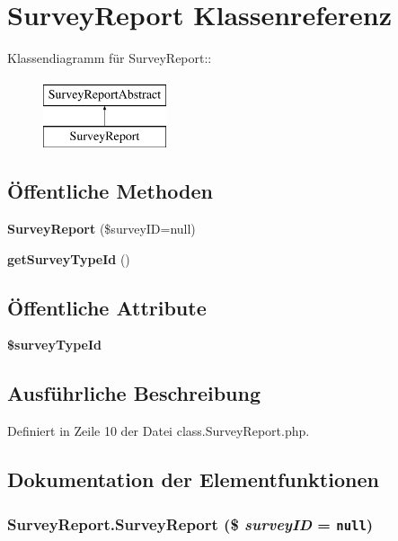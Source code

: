 \section{SurveyReport Klassenreferenz}
\label{classSurveyReport}
Klassendiagramm für SurveyReport::\begin{figure}[H]
\begin{center}
\leavevmode
\includegraphics[height=2cm]{classSurveyReport}
\end{center}
\end{figure}
\subsection*{Öffentliche Methoden}
\begin{CompactItemize}
\item 
{\bf SurveyReport} (\$surveyID=null)
\item 
{\bf getSurveyTypeId} ()
\end{CompactItemize}
\subsection*{Öffentliche Attribute}
\begin{CompactItemize}
\item 
{\bf \$surveyTypeId}
\end{CompactItemize}


\subsection{Ausführliche Beschreibung}


Definiert in Zeile 10 der Datei class.SurveyReport.php.

\subsection{Dokumentation der Elementfunktionen}
\subsubsection{\setlength{\rightskip}{0pt plus 5cm}SurveyReport.SurveyReport (\$ {\em surveyID} = {\tt null})}\label{classSurveyReport_2fac5bc3ac1d78ee6e4d9f7be7bc5562}




